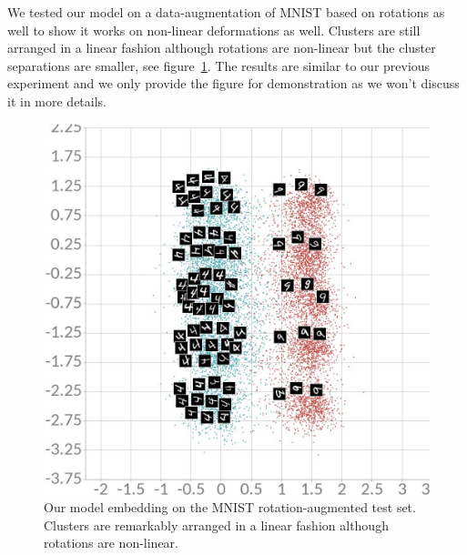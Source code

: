 \documentclass[a4paper,12pt]{report}
\begin{document}
We tested our model on a data-augmentation of MNIST based on rotations as well to show it works on non-linear deformations as well.
Clusters are still arranged in a linear fashion although rotations are non-linear but the cluster separations are smaller, see figure~\ref{fig:mnist_cl2d_rotate}.
The results are similar to our previous experiment and we only provide the figure for demonstration as we won't discuss it in more details.

\begin{figure}[h]
    \begin{center}
        \includegraphics{thesis_figures/mnist_cl2d_rotate.jpg}
    \end{center}
    \caption{Our model embedding on the MNIST rotation-augmented test set.
    Clusters are remarkably arranged in a linear fashion although rotations are non-linear.
    }
    \label{fig:mnist_cl2d_rotate}
\end{figure}
\end{document}
